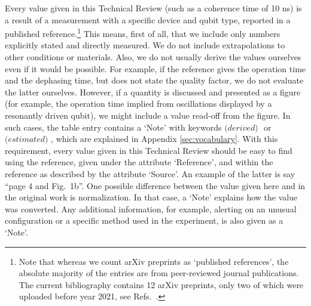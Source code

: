 \documentclass[aps, prx, showpacs, twocolumn, superscriptaddress, notitlepage, longbibliography, floatfix, nofootinbib]{revtex4-2}
\newcommand{\estimated}{\textit{(estimated) }}
\newcommand{\derived}{\textit{(derived) }}
\newcommand{\myKey}[1]{$\whitearrowupfrombar$\textit{#1}}
\renewcommand{\myKey}[1]{\textit{#1}}
\renewcommand{\myKey}[1]{`{#1}'}
\newcommand{\recheck}[1]{{#1}}
\begin{document}
Every value given in this Technical Review (such as a coherence time of 10 ns) is a result of a measurement with a specific device and qubit type, reported in a published reference.\footnote{\recheck{Note that whereas we count arXiv preprints as `published references', the absolute majority of the entries are from peer-reviewed journal publications. The current bibliography contains 12 arXiv preprints, only two of which were uploaded before year 2021, see Refs.~\cite{hayes_lifetime_2009,cerfontaine_feedback-tuned_2016}.}} This means, first of all, that we include only numbers explicitly stated and directly measured. We do not include extrapolations to other conditions or materials. Also, we do not usually derive the values ourselves even if it would be possible. For example, if the reference gives the operation time and the dephasing time, but does not state the quality factor, we do not evaluate the latter ourselves. However, if a quantity is discussed and presented as a figure (for example, the operation time implied from oscillations displayed by a resonantly driven qubit), we might include a value read-off from the figure. In such cases, the table entry contains a \myKey{Note} with keywords $\derived$\! or $\estimated$\!, which are explained in Appendix \ref{sec:vocabulary}. With this requirement, every value given in this Technical Review should be easy to find using the reference, given under the attribute \myKey{Reference}, and within the reference as described by the attribute \myKey{Source}. An example of the latter is say ``page 4 and Fig.~1b''. One possible difference between the value given here and in the original work is normalization. In that case, a \myKey{Note} explains how the value was converted. Any additional information, for example, alerting on an unusual configuration or a specific method used in the experiment, is also given as a \myKey{Note}. 
\end{document}
